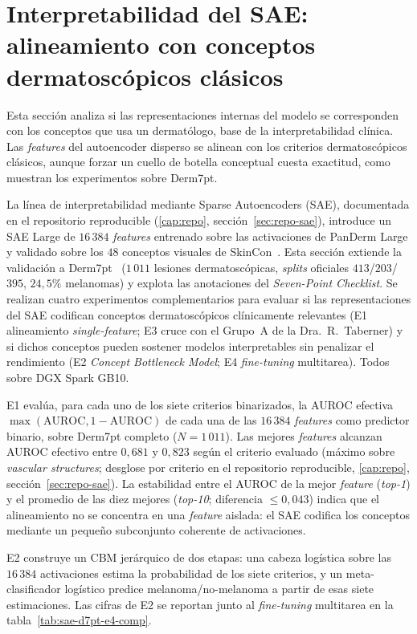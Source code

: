 \section{Interpretabilidad del SAE: alineamiento con conceptos
dermatoscópicos clásicos}
\label{sec:sae-derm7pt}

Esta sección analiza si las representaciones internas del modelo se
corresponden con los conceptos que usa un dermatólogo, base de la
interpretabilidad clínica. Las \emph{features} del autoencoder disperso
se alinean con los criterios dermatoscópicos clásicos, aunque forzar un
cuello de botella conceptual cuesta exactitud, como muestran los
experimentos sobre Derm7pt.

La línea de interpretabilidad mediante Sparse Autoencoders (SAE),
documentada en el repositorio reproducible (\ref{cap:repo}, sección~\ref{sec:repo-sae}), introduce un SAE Large de $16\,384$
\emph{features} entrenado sobre las activaciones de PanDerm Large y
validado sobre los $48$ conceptos visuales de SkinCon~\cite{skincon}.
Esta sección extiende la validación a Derm7pt~\cite{kawahara2019}
($1\,011$ lesiones dermatoscópicas, \emph{splits} oficiales
$413$/$203$/$395$, $24{,}5\%$ melanomas) y explota las anotaciones del
\emph{Seven-Point Checklist}. Se realizan cuatro experimentos
complementarios para evaluar si las representaciones del SAE codifican
conceptos dermatoscópicos clínicamente relevantes (E1 alineamiento
\emph{single-feature}; E3 cruce con el Grupo~A de la Dra.~R.~Taberner) y
si dichos conceptos pueden sostener modelos interpretables sin penalizar
el rendimiento (E2 \emph{Concept Bottleneck Model}; E4 \emph{fine-tuning}
multitarea). Todos sobre DGX Spark GB10.

E1 evalúa, para cada uno de los siete criterios binarizados, la AUROC
efectiva $\max(\mathrm{AUROC}, 1-\mathrm{AUROC})$ de cada una de las
$16\,384$ \emph{features} como predictor binario, sobre Derm7pt
completo ($N = 1\,011$). Las mejores \emph{features} alcanzan AUROC
efectivo entre $0{,}681$ y $0{,}823$ según el criterio evaluado
(máximo sobre \emph{vascular structures}; desglose por criterio en el
repositorio reproducible, \ref{cap:repo}, sección~\ref{sec:repo-sae}).
La estabilidad entre el AUROC de la mejor \emph{feature} (\emph{top-1})
y el promedio de las diez mejores (\emph{top-10}; diferencia
$\leq 0{,}043$) indica que el alineamiento no se concentra en una
\emph{feature} aislada: el SAE codifica los conceptos mediante un
pequeño subconjunto coherente de activaciones.

E2 construye un CBM jerárquico de dos etapas: una cabeza logística
sobre las $16\,384$ activaciones estima la probabilidad de los siete
criterios, y un meta-clasificador logístico predice
melanoma/no-melanoma a partir de esas siete estimaciones. Las cifras
de E2 se reportan junto al \emph{fine-tuning} multitarea en la
tabla~\ref{tab:sae-d7pt-e4-comp}.

